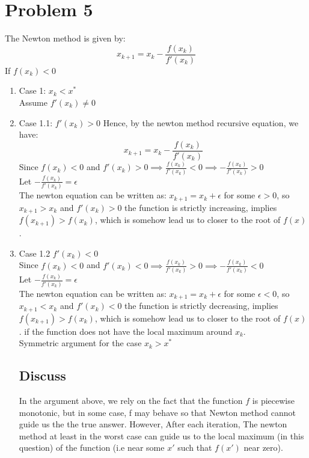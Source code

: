 \documentclass[11pt]{article}
\newcommand{\1}{\mathbbm{1}}
\begin{document}
\section*{Problem 5}
The Newton method is given by:
$$x_{k+1} = x_k -\frac{f(x_k)}{f'(x_k)}$$
If $f(x_k) < 0$\\
\begin{enumerate}

\item Case 1: $ x_k < x^* $\\
Assume $f'(x_k) \neq 0 $
\item Case 1.1: $f'(x_k) > 0 $
Hence, by the newton method recursive equation, we have:
$$x_{k+1} = x_k -\frac{f(x_k)}{f'(x_k)}$$
Since $f(x_k) <0$ and $f'(x_k) > 0 \implies \frac{f(x_k)}{f'(x_k)} < 0 \implies -\frac{f(x_k)}{f'(x_k)}>0$\\
Let $-\frac{f(x_k)}{f'(x_k)} = \epsilon$\\
The newton equation can be written as:
$x_{k+1} = x_k + \epsilon$ for some $\epsilon >0$, so $x_{k+1}>x_k$ and $f'(x_k) > 0$ the function is strictly increasing, implies $f(x_{k+1}) > f(x_k)$, which is somehow lead us to closer to the root of $f(x)$.

\item Case 1.2 $f'(x_k)<0$\\
Since $f(x_k) <0$ and $f'(x_k) < 0 \implies \frac{f(x_k)}{f'(x_k)} > 0 \implies -\frac{f(x_k)}{f'(x_k)}<0$\\
Let $-\frac{f(x_k)}{f'(x_k)} = \epsilon$\\
The newton equation can be written as:
$x_{k+1} = x_k + \epsilon$ for some $\epsilon <0$, so $x_{k+1}<x_k$ and $f'(x_k) < 0$ the function is strictly decreasing, implies $f(x_{k+1}) > f(x_k)$, which is somehow lead us to closer to the root of $f(x)$. if the function does not have the local maximum around $x_k$.\\
Symmetric argument for the case $x_k > x^*$\\

\subsection{Discuss}
In the argument above, we rely on the fact that the function $f$ is piecewise monotonic, but in some case, f may behave so that Newton method cannot guide us the the true answer. However, After each iteration, The newton method at least in the worst case can guide us to the local maximum (in this question) of the function (i.e near some $x'$ such that $f(x')$ near zero).






\end{enumerate}
\end{document}
